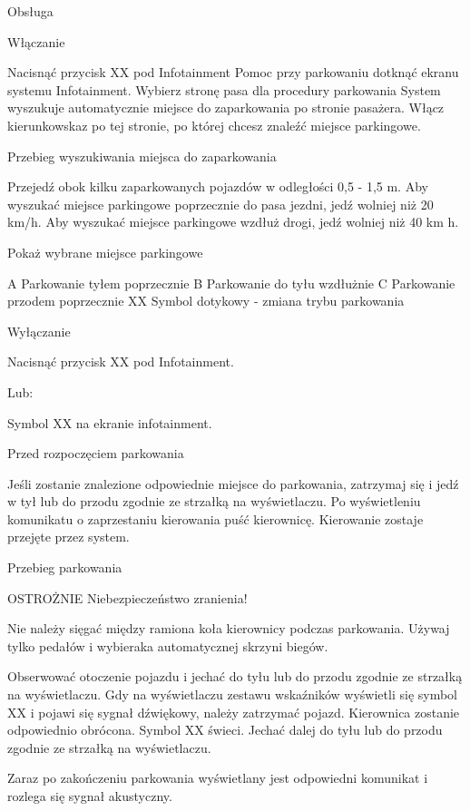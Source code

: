Obsługa

Włączanie
\begin{itemizeArrow}
	\itemArrow Nacisnąć przycisk XX pod Infotainment Pomoc przy parkowaniu dotknąć ekranu systemu Infotainment. Wybierz stronę pasa dla procedury parkowania System wyszukuje automatycznie miejsce do zaparkowania po stronie pasażera.
	\itemArrow Włącz kierunkowskaz po tej stronie, po której chcesz znaleźć miejsce parkingowe.
\end{itemizeArrow}

Przebieg wyszukiwania miejsca do zaparkowania
\begin{itemizeArrow}
	\itemArrow Przejedź obok kilku zaparkowanych pojazdów w odległości 0,5 - 1,5 m.
	\itemArrow Aby wyszukać miejsce parkingowe poprzecznie do pasa jezdni, jedź wolniej niż 20 km/h.
	\itemArrow Aby wyszukać miejsce parkingowe wzdłuż drogi, jedź wolniej niż 40 km h.
\end{itemizeArrow}

Pokaż wybrane miejsce parkingowe

A Parkowanie tyłem poprzecznie
B Parkowanie do tyłu wzdłużnie
C Parkowanie przodem poprzecznie
XX Symbol dotykowy - zmiana trybu parkowania

Wyłączanie
\begin{itemizeArrow}
	\itemArrow Nacisnąć przycisk XX pod Infotainment.
\end{itemizeArrow}
Lub:
\begin{itemizeArrow}
	\itemArrow Symbol XX na ekranie infotainment.
\end{itemizeArrow}

Przed rozpoczęciem parkowania

\begin{itemizeArrow}
	\itemArrow Jeśli zostanie znalezione odpowiednie miejsce do parkowania, zatrzymaj się i jedź w tył lub do przodu zgodnie ze strzałką na wyświetlaczu.
	\itemArrow Po wyświetleniu komunikatu o zaprzestaniu kierowania puść kierownicę. Kierowanie zostaje przejęte przez system.
\end{itemizeArrow}

Przebieg parkowania

OSTROŻNIE
Niebezpieczeństwo zranienia!
\begin{itemizeTriangle}
	\itemTriangle Nie należy sięgać między ramiona koła kierownicy podczas parkowania.
	\itemTriangle Używaj tylko pedałów i wybieraka automatycznej skrzyni biegów.
	\begin{itemizeArrow}
		\itemArrow Obserwować otoczenie pojazdu i jechać do tyłu lub do przodu zgodnie ze strzałką na wyświetlaczu.
		\itemArrow Gdy na wyświetlaczu zestawu wskaźników wyświetli się symbol XX i pojawi się sygnał dźwiękowy, należy zatrzymać pojazd. Kierownica zostanie odpowiednio obrócona. Symbol XX świeci.
		\itemArrow Jechać dalej do tyłu lub do przodu zgodnie ze strzałką na wyświetlaczu.
	\end{itemizeArrow}
\end{itemizeTriangle}
Zaraz po zakończeniu parkowania wyświetlany jest odpowiedni komunikat i rozlega się sygnał akustyczny.

